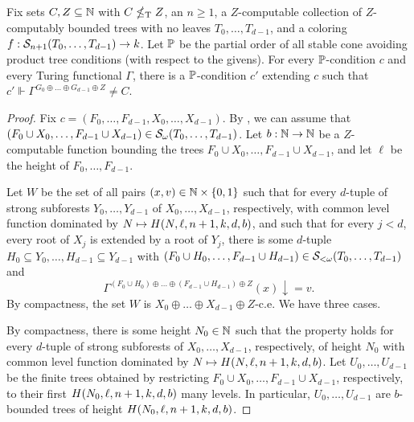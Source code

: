 \begin{lemma}\label{thm:cmtt-admits-strong-cone-avoidance-req}
Fix sets $C,Z \subseteq \mathbb{N}$ with $C \nleq_{\text{\upshape T}} Z$, an $n \geq 1$, a 
	$Z$-computable collection of $Z$-computably bounded trees with no leaves $T_0, \dots, T_{d-1}$, and a coloring $f: \mathcal{S}_{n+1}({T_0, \dots, T_{d-1}}) \to k$. Let $\mathbb{P}$ be the partial order of all stable cone avoiding product tree conditions (with respect to the givens). For every $\mathbb{P}$-condition $c$ and every Turing functional $\Gamma$, there is a $\mathbb{P}$-condition $c'$ extending $c$ such that $c' \Vdash \Gamma^{G_0 \oplus \dots \oplus G_{d-1} \oplus Z} \neq C$.
\end{lemma}
\begin{proof}
Fix $c = (F_0, \dots, F_{d-1}, X_0, \dots, X_{d-1})$. By , we can assume that $(F_0 \cup X_0, \dots, F_{d-1} \cup X_{d-1}) \in \mathcal{S}_{\omega}({T_0, \dots, T_{d-1}})$. Let $b: \mathbb{N} \to \mathbb{N}$ be a $Z$-computable function bounding the trees $F_0 \cup X_0, \dots, F_{d-1} \cup X_{d-1}$,
	and let $\ell$ be the height of $F_0, \dots, F_{d-1}$.


Let $W$ be the set of all pairs $(x, v) \in \mathbb{N} \times \{0,1\}$ such that for every $d$-tuple of strong subforests $Y_0, \dots, Y_{d-1}$ of $X_0, \dots, X_{d-1}$, respectively, with common level function dominated by $N \mapsto H(N,\ell,n+1,k,d, b)$, and such that for every $j < d$, every root of $X_j$ is extended by a root of $Y_j$, there is some $d$-tuple $H_0 \subseteq Y_0, \dots, H_{d-1} \subseteq Y_{d-1}$
	with $(F_0 \cup H_0, \dots, F_{d-1} \cup H_{d-1}) \in \mathcal{S}_{<\omega}({T_0, \dots, T_{d-1}})$ and
$$
\Gamma^{(F_0 \cup H_0) \oplus \dots \oplus (F_{d-1} \cup H_{d-1}) \oplus Z}(x)\downarrow = v.
$$
By compactness, the set $W$ is $X_0 \oplus \dots \oplus X_{d-1} \oplus Z$-c.e. We have three cases.

 By compactness, there is some height $N_0 \in \mathbb{N}$ such that the property holds for every $d$-tuple
of strong subforests of $X_0, \dots, X_{d-1}$, respectively, of height $N_0$ with common level function dominated by $N \mapsto H(N,\ell,n+1,k,d, b)$.
Let $U_0, \dots, U_{d-1}$ be the finite trees obtained by restricting $F_0 \cup X_0, \dots, F_{d-1} \cup X_{d-1}$, respectively, to their first $H(N_0,\ell,n+1,k,d, b)$ many levels.
In particular, $U_0, \dots, U_{d-1}$ are $b$-bounded trees of height $H(N_0,\ell,n+1,k,d, b)$.


\end{proof}
